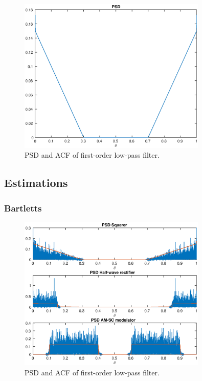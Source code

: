 \documentclass[a4paper,12pt]{article}
\begin{document}
\begin{figure}[h]
\centering
\includegraphics[width=0.8\textwidth]{bilder/Lab2/Lab2fig1.eps}
\caption{PSD and ACF of first-order low-pass filter.}
\label{fig:Lab1fig1}
\end{figure}


\subsection{Estimations}

\subsubsection{Bartletts}
\begin{figure}[h]
\centering
\includegraphics[width=0.8\textwidth]{bilder/Lab2/Lab2fig7.eps}
\caption{PSD and ACF of first-order low-pass filter.}
\label{fig:Lab1fig1}
\end{figure}
\end{document}
